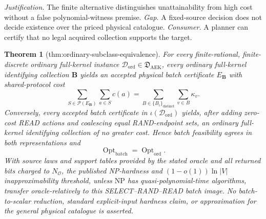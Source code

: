 \documentclass{article}
\newtheorem{theorem}{Theorem}
\begin{document}
\par\smallskip\noindent \textit{Justification.} The finite alternative distinguishes unattainability from high cost without a false polynomial-witness premise. \textit{Gap.} A fixed-source decision does not decide existence over the priced physical catalogue. \textit{Consumer.} A planner can certify that no legal acquired collection supports the target.

\begin{theorem}[thm:ordinary-subclass-equivalence]\label{thm:ordinary-subclass-equivalence}
For every finite-rational, finite-discrete ordinary full-kernel instance \(\mathcal D_{\mathrm{ord}}\in\mathfrak D_{\mathrm{AEK}}\), every ordinary full-kernel identifying collection \(\mathbf B\) yields an accepted physical batch certificate \(E_{\mathbf B}\) with shared-protocol cost
\[
 \sum_{S\in\mathcal P(E_{\mathbf B})}\sum_{a\in S}c(a)
 =\sum_{B\in\{B_i\}_{\mathrm{distinct}}}\sum_{v\in B}\kappa_v.
\]
Conversely, every accepted batch certificate in \(\iota(\mathcal D_{\mathrm{ord}})\) yields, after adding zero-cost READ actions and coalescing equal RAND-endpoint sets, an ordinary full-kernel identifying collection of no greater cost.  Hence batch feasibility agrees in both representations and
\[
 \operatorname{Opt}_{\mathrm{batch}}=\operatorname{Opt}_{\mathrm{ord}}.
\]
With source laws and support tables provided by the stated oracle and all returned bits charged to \(N_{\mathcal O}\), the published NP-hardness and \((1-o(1))\ln|V|\) inapproximability threshold, unless \(\mathrm{NP}\) has quasi-polynomial-time algorithms, transfer oracle-relatively to this SELECT--RAND--READ batch image.  No batch-to-scalar reduction, standard explicit-input hardness claim, or approximation for the general physical catalogue is asserted.

\end{theorem}
\end{document}
